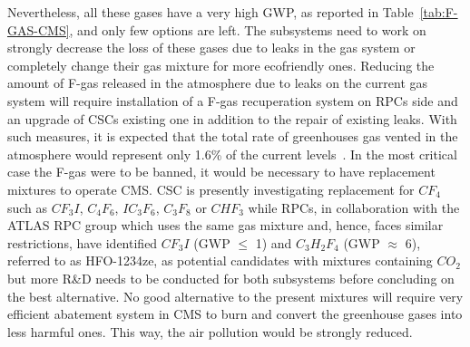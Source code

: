 	Nevertheless, all these gases have a very high GWP, as reported in Table~\ref{tab:F-GAS-CMS}, and only few options are left. The subsystems need to work on strongly decrease the loss of these gases due to leaks in the gas system or completely change their gas mixture for more ecofriendly ones. Reducing the amount of F-gas released in the atmosphere due to leaks on the current gas system will require installation of a F-gas recuperation system on RPCs side and an upgrade of CSCs existing one in addition to the repair of existing leaks. With such measures, it is expected that the total rate of greenhouses gas vented in the atmosphere would represent only 1.6\% of the current levels~\cite{PHASEIITP}. In the most critical case the F-gas were to be banned, it would be necessary to have replacement mixtures to operate CMS. CSC is presently investigating replacement for $CF_4$ such as $CF_3I$, $C_4F_6$, $IC_3F_6$, $C_3F_8$ or $CHF_3$ while RPCs, in collaboration with the ATLAS RPC group which uses the same gas mixture and, hence, faces similar restrictions, have identified $CF_3I$ (GWP $\leq$ 1) and $C_3H_2F_4$ (GWP $\approx$ 6), referred to as HFO-1234ze, as potential candidates with mixtures containing $CO_2$ but more R\&D needs to be conducted for both subsystems before concluding on the best alternative. No good alternative to the present mixtures will require very efficient abatement system in CMS to burn and convert the greenhouse gases into less harmful ones. This way, the air pollution would be strongly reduced.
	
